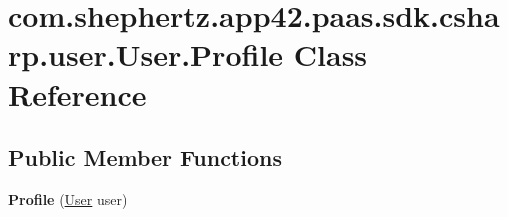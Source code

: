 \hypertarget{classcom_1_1shephertz_1_1app42_1_1paas_1_1sdk_1_1csharp_1_1user_1_1_user_1_1_profile}{\section{com.\+shephertz.\+app42.\+paas.\+sdk.\+csharp.\+user.\+User.\+Profile Class Reference}
\label{classcom_1_1shephertz_1_1app42_1_1paas_1_1sdk_1_1csharp_1_1user_1_1_user_1_1_profile}
}
\subsection*{Public Member Functions}
\begin{DoxyCompactItemize}
\item 
\hypertarget{classcom_1_1shephertz_1_1app42_1_1paas_1_1sdk_1_1csharp_1_1user_1_1_user_1_1_profile_a46ca02109de743bdbfd2c976452cca95}{{\bfseries Profile} (\hyperlink{classcom_1_1shephertz_1_1app42_1_1paas_1_1sdk_1_1csharp_1_1user_1_1_user}{User} user)}\label{classcom_1_1shephertz_1_1app42_1_1paas_1_1sdk_1_1csharp_1_1user_1_1_user_1_1_profile_a46ca02109de743bdbfd2c976452cca95}


\end{DoxyCompactItemize}
